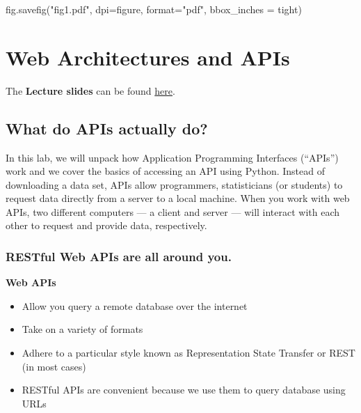 \documentclass[
  letterpaper,
  DIV=11,
  numbers=noendperiod]{scrreprt}
\newenvironment{Shaded}{\begin{snugshade}}{\end{snugshade}}
\newcommand{\BuiltInTok}[1]{\textcolor[rgb]{0.00,0.23,0.31}{#1}}
\newcommand{\NormalTok}[1]{\textcolor[rgb]{0.00,0.23,0.31}{#1}}
\newcommand{\OperatorTok}[1]{\textcolor[rgb]{0.37,0.37,0.37}{#1}}
\newcommand{\StringTok}[1]{\textcolor[rgb]{0.13,0.47,0.30}{#1}}
\providecommand{\tightlist}{%
  \setlength{\itemsep}{0pt}\setlength{\parskip}{0pt}}\usepackage{longtable,booktabs,array}
\begin{document}
\begin{Shaded}
\begin{Highlighting}[]
\NormalTok{fig.savefig(}\StringTok{"fig1.pdf"}\NormalTok{, dpi}\OperatorTok{=}\StringTok{\textquotesingle{}figure\textquotesingle{}}\NormalTok{, }\BuiltInTok{format}\OperatorTok{=}\StringTok{"pdf"}\NormalTok{, bbox\_inches }\OperatorTok{=} \StringTok{\textquotesingle{}tight\textquotesingle{}}\NormalTok{)}
\end{Highlighting}
\end{Shaded}


\chapter{Web Architectures and APIs}\label{web-architectures-and-apis}

The \textbf{Lecture slides} can be found
\href{https://github.com/GDSL-UL/wma/raw/main/lectures/w03.html}{here}.

\section{What do APIs actually do?}\label{what-do-apis-actually-do}

In this lab, we will unpack how Application Programming Interfaces
(``APIs'') work and we cover the basics of accessing an API using
Python. Instead of downloading a data set, APIs allow programmers,
statisticians (or students) to request data directly from a server to a
local machine. When you work with web APIs, two different computers ---
a client and server --- will interact with each other to request and
provide data, respectively.

\subsection{RESTful Web APIs are all around
you.}\label{restful-web-apis-are-all-around-you.}

\textbf{Web APIs}

\begin{itemize}
\tightlist
\item
  Allow you query a remote database over the internet
\item
  Take on a variety of formats
\item
  Adhere to a particular style known as Representation State Transfer or
  REST (in most cases)
\item
  RESTful APIs are convenient because we use them to query database
  using URLs
\end{itemize}
\end{document}
